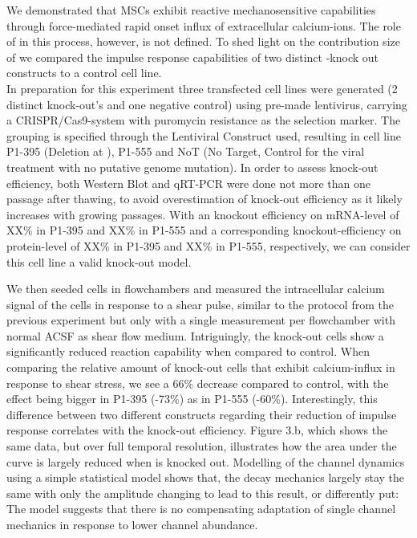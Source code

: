 We demonstrated that MSCs exhibit reactive mechanosensitive capabilities through force-mediated rapid onset influx of extracellular calcium-ions. The role of \Piezo{} in this process, however, is not defined. To shed light on the contribution size of \Piezo{} we compared the impulse response capabilities of two distinct \Piezo{}-knock out constructs to a control cell line.\\
In preparation for this experiment three transfected cell lines were generated (2 distinct \Piezo{} knock-out's and one negative control) using pre-made lentivirus, carrying a CRISPR/Cas9-system with puromycin resistance as the selection marker. The grouping is specified through the Lentiviral Construct used, resulting in cell line P1-395 (Deletion at ), P1-555 and NoT (No Target, Control for the viral treatment with no putative genome mutation).  In order to assess knock-out efficiency, both Western Blot and qRT-PCR were done not more than one passage after thawing, to avoid overestimation of knock-out efficiency as it likely increases with growing passages. With an knockout efficiency on mRNA-level of XX\% in P1-395 and XX\% in P1-555 and a corresponding knockout-efficiency on protein-level of XX\% in P1-395 and XX\% in P1-555, respectively, we can consider this cell line a valid knock-out model.  

We then seeded cells in flowchambers and measured the intracellular calcium signal of the cells in response to a shear pulse, similar to the protocol from the previous experiment but only with a single measurement per flowchamber with normal ACSF as shear flow medium. Intriguingly, the knock-out cells show a significantly reduced reaction capability when compared to control.  When comparing the relative amount of knock-out cells that exhibit calcium-influx in response to shear stress, we see a 66\% decrease compared to control, with the effect being bigger in P1-395 (-73\%) as in P1-555 (-60\%). Interestingly, this difference between two different constructs regarding their reduction of impulse response correlates with the knock-out efficiency. Figure 3.b, which shows the same data, but over full temporal resolution, illustrates how the area under the curve is largely reduced when \Piezo{} is knocked out. Modelling of the channel dynamics using a simple statistical model shows that, the decay mechanics largely stay the same with only the amplitude changing to lead to this result, or differently put: The model suggests that there is no compensating adaptation of single channel mechanics in response to lower channel abundance.

